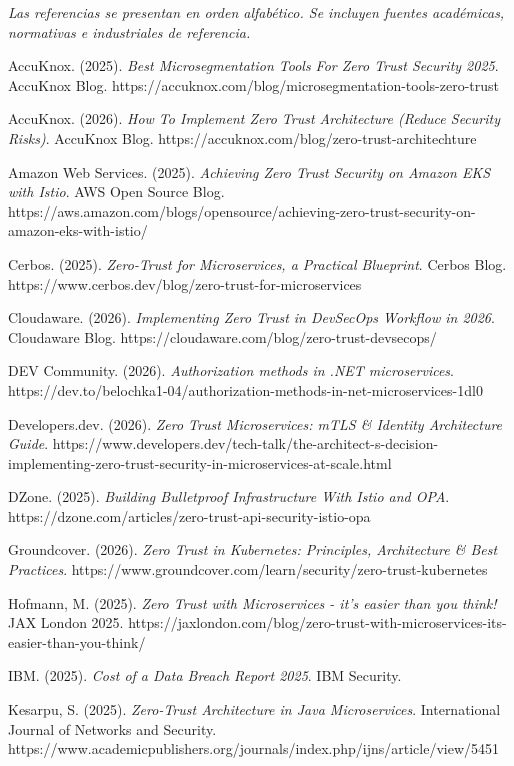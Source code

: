 \documentclass[12pt,a4paper]{article}
\begin{document}
\begin{mdframed}[style=quoteStyle]
\textit{\textit{Las referencias se presentan en orden alfabético. Se incluyen fuentes académicas, normativas e industriales de referencia.}}
\end{mdframed}

AccuKnox. (2025). \textit{Best Microsegmentation Tools For Zero Trust Security 2025}. AccuKnox Blog. https://accuknox.com/blog/microsegmentation-tools-zero-trust

AccuKnox. (2026). \textit{How To Implement Zero Trust Architecture (Reduce Security Risks)}. AccuKnox Blog. https://accuknox.com/blog/zero-trust-architechture

Amazon Web Services. (2025). \textit{Achieving Zero Trust Security on Amazon EKS with Istio}. AWS Open Source Blog. https://aws.amazon.com/blogs/opensource/achieving-zero-trust-security-on-amazon-eks-with-istio/

Cerbos. (2025). \textit{Zero-Trust for Microservices, a Practical Blueprint}. Cerbos Blog. https://www.cerbos.dev/blog/zero-trust-for-microservices

Cloudaware. (2026). \textit{Implementing Zero Trust in DevSecOps Workflow in 2026}. Cloudaware Blog. https://cloudaware.com/blog/zero-trust-devsecops/

DEV Community. (2026). \textit{Authorization methods in .NET microservices}. https://dev.to/belochka1-04/authorization-methods-in-net-microservices-1dl0

Developers.dev. (2026). \textit{Zero Trust Microservices: mTLS \& Identity Architecture Guide}. https://www.developers.dev/tech-talk/the-architect-s-decision-implementing-zero-trust-security-in-microservices-at-scale.html

DZone. (2025). \textit{Building Bulletproof Infrastructure With Istio and OPA}. https://dzone.com/articles/zero-trust-api-security-istio-opa

Groundcover. (2026). \textit{Zero Trust in Kubernetes: Principles, Architecture \& Best Practices}. https://www.groundcover.com/learn/security/zero-trust-kubernetes

Hofmann, M. (2025). \textit{Zero Trust with Microservices - it's easier than you think!} JAX London 2025. https://jaxlondon.com/blog/zero-trust-with-microservices-its-easier-than-you-think/

IBM. (2025). \textit{Cost of a Data Breach Report 2025}. IBM Security.

Kesarpu, S. (2025). \textit{Zero-Trust Architecture in Java Microservices}. International Journal of Networks and Security. https://www.academicpublishers.org/journals/index.php/ijns/article/view/5451
\end{document}

